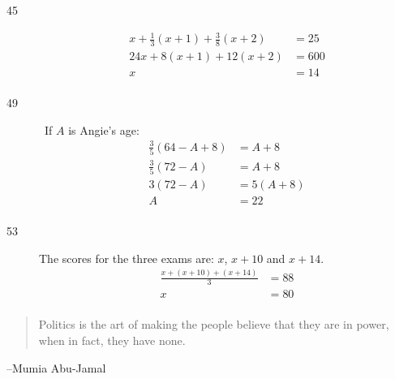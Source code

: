 \documentclass[letterpaper, landscape]{exam}
\begin{document}
\begin{description}

      \item[45]
        \begin{align*}
          x + \frac{1}{3} (x + 1) + \frac{3}{8} (x + 2)            & = 25 \\
          24x + 8(x + 1) + 12(x + 2)                               & = 600 \\
          x                                                        & = \boxed{ 14 } \\
        \end{align*}

      \item[49] \ 
      If $A$ is Angie's age:
      \begin{align*}
        \frac{3}{5}(64 - A + 8)       & = A + 8 \\
        \frac{3}{5} (72 - A)          & = A + 8 \\
        3(72 - A)                     & = 5(A + 8) \\
        A                             & = 22 \\
      \end{align*}
      
      \item[53] 
        The scores for the three exams are: $x$, $x + 10$ and $x + 14$.
        \begin{align*}
          \frac{ x + (x + 10) + (x + 14) }{3} & = 88 \\
          x                                   & = 80 \\
        \end{align*}
    \end{description}

  \fi

  \ifprintanswers{}
  \else
    \vspace{10 cm}
    \begin{quote}
      \begin{em}
        Politics is the art of making the people believe that they are in
        power, when in fact, they have none.        
      \end{em}
    \end{quote}
    \hspace{1 cm} --Mumia Abu-Jamal
  \fi
\end{document}
